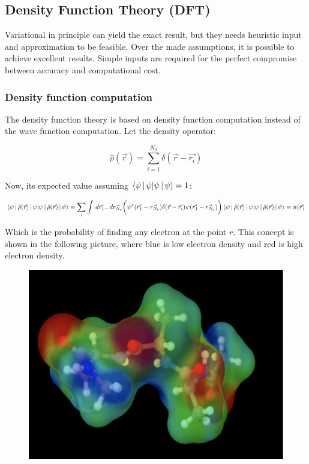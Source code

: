 	\subsection{Density Function Theory (DFT)}
	Variational in principle can yield the exact result, but they needs heuristic input and approximation to be feasible.
	Over the made assumptions, it is possible to achieve excellent results.
	Simple inputs are required for the perfect compromise between accuracy and computational cost.

		\subsubsection{Density function computation}
		The density function theory is based on density function computation instead of the wave function computation.
		Let the density operator:

		$$\hat{\rho}(\vec{r})=\sum_{i=1}^{N_0}\delta(\vec{r}-\vec{r_i})$$

		Now, its expected value assuming $\braket{\psi\,|\,\psi}=1$:

		$$\braket{\psi\,|\,\hat{\rho}(\vec{r})\,|\,\psi}=\sum_i \int\,d\vec{r_1}...d\vec{r_{N_e}}\bigg(\psi^*(\vec{r_1}-\vec{r_{N_e}})\delta(\vec{r}-\vec{r_i})\psi(\vec{r_1}-\vec{r_{N_e}})\bigg)\braket{\psi\,|\,\hat{\rho}(\vec{r})\,|\,\psi}=n(\vec{r})$$

		Which is the probability of finding any electron at the point $r$.
		This concept is shown in the following picture,  where blue is low electron density and red is high electron density.

		\begin{figure}[htbp!]
			\centering
			\includegraphics[scale=0.30]{img_14}
		\end{figure}

